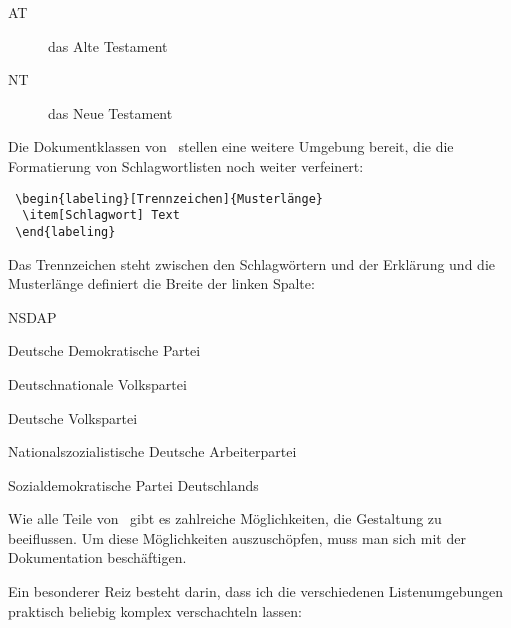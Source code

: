 \begin{LTXexample}
\begin{description}
 \item[AT] das Alte Testament
 \item[NT] das Neue Testament 
\end{description} 
\end{LTXexample}


Die Dokumentklassen von \KOMAScript\ stellen eine weitere Umgebung bereit, die die 
Formatierung von Schlagwortlisten noch weiter verfeinert:

\begin{lstlisting}
 \begin{labeling}[Trennzeichen]{Musterlänge}
  \item[Schlagwort] Text
 \end{labeling}
\end{lstlisting}

Das Trennzeichen steht zwischen den Schlagwörtern und der Erklärung und die Musterlänge definiert
die Breite der linken Spalte:

\begin{LTXexample}
 \begin{labeling}[=]{NSDAP}
  \item[DDP] Deutsche Demokratische Partei
  \item[DNVP] Deutschnationale Volkspartei
  \item[DVP] Deutsche Volkspartei
  \item[NSDAP] Nationalszozialistische Deutsche Arbeiterpartei
  \item[SPD] Sozialdemokratische Partei Deutschlands
 \end{labeling}
\end{LTXexample}

Wie alle Teile von \KOMAScript\ gibt es zahlreiche Möglichkeiten, die Gestaltung zu
beeiflussen. Um diese Möglichkeiten auszuschöpfen, muss man sich mit der Dokumentation 
beschäftigen.



Ein besonderer Reiz besteht darin, dass ich die verschiedenen Listenumgebungen praktisch
beliebig komplex verschachteln lassen:

